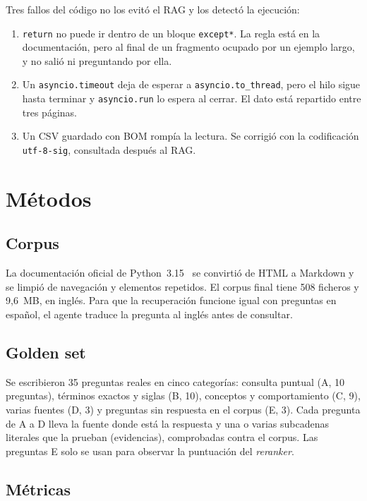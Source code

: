 \documentclass[pdflatex,sn-mathphys-num]{sn-jnl}
\begin{document}
Tres fallos del código no los evitó el RAG y los detectó la ejecución:
\begin{enumerate}
\item \texttt{return} no puede ir dentro de un bloque \texttt{except*}. La regla está en la documentación, pero al final de un fragmento ocupado por un ejemplo largo, y no salió ni preguntando por ella.
\item Un \texttt{asyncio.timeout} deja de esperar a \texttt{asyncio.to\_thread}, pero el hilo sigue hasta terminar y \texttt{asyncio.run} lo espera al cerrar. El dato está repartido entre tres páginas.
\item Un CSV guardado con BOM rompía la lectura. Se corrigió con la codificación \texttt{utf-8-sig}, consultada después al RAG.
\end{enumerate}

\section{Métodos}\label{sec:metodos}

\subsection{Corpus}

La documentación oficial de Python~3.15~\cite{pythondocs} se convirtió de HTML a Markdown y se limpió de navegación y elementos repetidos. El corpus final tiene 508 ficheros y 9,6~MB, en inglés. Para que la recuperación funcione igual con preguntas en español, el agente traduce la pregunta al inglés antes de consultar.

\subsection{Golden set}

Se escribieron 35 preguntas reales en cinco categorías: consulta puntual (A, 10 preguntas), términos exactos y siglas (B, 10), conceptos y comportamiento (C, 9), varias fuentes (D, 3) y preguntas sin respuesta en el corpus (E, 3). Cada pregunta de A a D lleva la fuente donde está la respuesta y una o varias subcadenas literales que la prueban (evidencias), comprobadas contra el corpus. Las preguntas E solo se usan para observar la puntuación del \emph{reranker}.

\subsection{Métricas}
\end{document}
